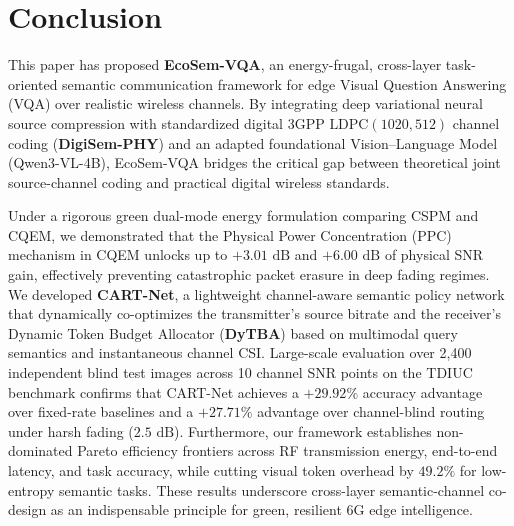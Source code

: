 \section{Conclusion}\label{sec:conclusion}
This paper has proposed \textbf{EcoSem-VQA}, an energy-frugal, cross-layer task-oriented semantic communication framework for edge Visual Question Answering (VQA) over realistic wireless channels. By integrating deep variational neural source compression with standardized digital 3GPP $\text{LDPC}(1020, 512)$ channel coding (\textbf{DigiSem-PHY}) and an adapted foundational Vision--Language Model (Qwen3-VL-4B), EcoSem-VQA bridges the critical gap between theoretical joint source-channel coding and practical digital wireless standards.

Under a rigorous green dual-mode energy formulation comparing CSPM and CQEM, we demonstrated that the Physical Power Concentration (PPC) mechanism in CQEM unlocks up to $+3.01\text{ dB}$ and $+6.00\text{ dB}$ of physical SNR gain, effectively preventing catastrophic packet erasure in deep fading regimes. We developed \textbf{CART-Net}, a lightweight channel-aware semantic policy network that dynamically co-optimizes the transmitter's source bitrate and the receiver's Dynamic Token Budget Allocator (\textbf{DyTBA}) based on multimodal query semantics and instantaneous channel CSI. Large-scale evaluation over 2,400 independent blind test images across 10 channel SNR points on the TDIUC benchmark confirms that CART-Net achieves a $+29.92\%$ accuracy advantage over fixed-rate baselines and a $+27.71\%$ advantage over channel-blind routing under harsh fading ($2.5\text{ dB}$). Furthermore, our framework establishes non-dominated Pareto efficiency frontiers across RF transmission energy, end-to-end latency, and task accuracy, while cutting visual token overhead by $49.2\%$ for low-entropy semantic tasks. These results underscore cross-layer semantic-channel co-design as an indispensable principle for green, resilient 6G edge intelligence.
